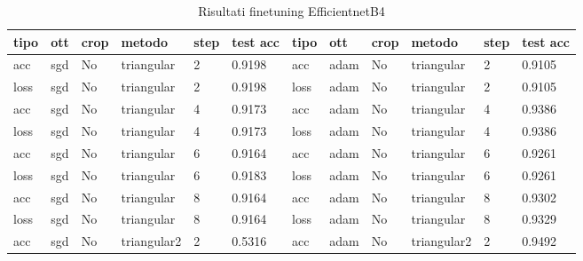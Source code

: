 \begin{table}[H]
\centering
\caption{Risultati finetuning EfficientnetB4}
\begin{adjustbox}{width=1\textwidth}
\begin{tabular}{|l|l|l|l|l|l||l|l|l|l|l|l|}
\hline
\textbf{tipo} & \textbf{ott} & \textbf{crop} & \textbf{metodo} & \textbf{step} & \textbf{test acc} & \textbf{tipo} & \textbf{ott} & \textbf{crop} & \textbf{metodo} & \textbf{step} & \textbf{test acc} \\ \hline
acc           & sgd          & No          & triangular      & 2             & 0.9198            & acc           & adam         & No          & triangular      & 2             & 0.9105            \\ \hline
loss          & sgd          & No          & triangular      & 2             & 0.9198            & loss          & adam         & No          & triangular      & 2             & 0.9105            \\ \hline
acc           & sgd          & No          & triangular      & 4             & 0.9173            & acc           & adam         & No          & triangular      & 4             & 0.9386            \\ \hline
loss          & sgd          & No          & triangular      & 4             & 0.9173            & loss          & adam         & No          & triangular      & 4             & 0.9386            \\ \hline
acc           & sgd          & No          & triangular      & 6             & 0.9164            & acc           & adam         & No          & triangular      & 6             & 0.9261            \\ \hline
loss          & sgd          & No          & triangular      & 6             & 0.9183            & loss          & adam         & No          & triangular      & 6             & 0.9261            \\ \hline
acc           & sgd          & No          & triangular      & 8             & 0.9164            & acc           & adam         & No          & triangular      & 8             & 0.9302            \\ \hline
loss          & sgd          & No          & triangular      & 8             & 0.9164            & loss          & adam         & No          & triangular      & 8             & 0.9329            \\ \hline
acc           & sgd          & No          & triangular2     & 2             & 0.5316            & acc           & adam         & No          & triangular2     & 2             & 0.9492            \\ \hline

\end{tabular}
\end{adjustbox}
\end{table}
